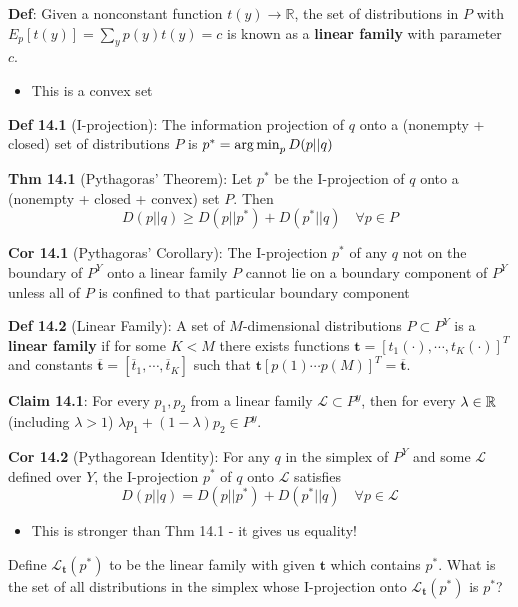 \documentclass[12pt]{article} %
\begin{document}
\textbf{Def}: Given a nonconstant function $t(y) \rightarrow \mathbb{R}$, the set of distributions in $P$ with $E_p[t(y)] = \sum_y p(y) t(y) = c$ is known as a \textbf{linear family} with parameter $c$. 
\begin{itemize}[topsep=-1pt, itemsep=-1pt]
    \item This is a convex set
\end{itemize}

\textbf{Def 14.1} (I-projection): The information projection of $q$ onto a (nonempty + closed) set of distributions $P$ is $p^* = \operatorname*{arg\,min}_p D(p||q)$

\textbf{Thm 14.1} (Pythagoras' Theorem): Let $p^*$ be the I-projection of $q$ onto a (nonempty + closed + convex) set $P$. Then 
\begin{equation*}
    D(p||q) \geq D(p ||p^*) + D(p^* || q) \quad \forall p \in P
\end{equation*}

\textbf{Cor 14.1} (Pythagoras' Corollary): The I-projection $p^*$ of any $q$ not on the boundary of $P^Y$ onto a linear family $P$ cannot lie on a boundary component of $P^Y$ unless all of $P$ is confined to that particular boundary component

\textbf{Def 14.2} (Linear Family): A set of $M$-dimensional distributions $P \subset P^Y$ is a \textbf{linear family} if for some $K < M$ there exists functions $\mathbf{t} = [t_1(\cdot), \cdots, t_K(\cdot)]^T$ and constants $\overline{\mathbf{t}} = [\overline{t}_1, \cdots, \overline{t}_K]$ such that $\mathbf{t}[p(1) \cdots p(M)]^T = \overline{\mathbf{t}}$.


\textbf{Claim 14.1}: For every $p_1,p_2$ from a linear family $\mathcal{L} \subset P^y$, then for every $\lambda \in \mathbb{R}$ (including $\lambda > 1$) $\lambda p_1 + (1-\lambda) p_2 \in P^y$.

\textbf{Cor 14.2} (Pythagorean Identity): For any $q$ in the simplex of $P^Y$ and some $\mathcal{L}$ defined over $Y$, the I-projection $p^*$ of $q$ onto $\mathcal{L}$ satisfies
\begin{equation*}
    D(p||q) = D(p||p^*) + D(p^* || q) \quad \forall p \in \mathcal{L}
\end{equation*}
\begin{itemize}[topsep=-1pt, itemsep=-1pt]
    \item This is stronger than Thm 14.1 - it gives us equality!
\end{itemize}

Define $\mathcal{L}_{\mathbf{t}}(p^*)$ to be the linear family with given $\mathbf{t}$ which contains $p^*$. What is the set of all distributions in the simplex whose I-projection onto $\mathcal{L}_{\mathbf{t}}(p^*)$ is $p^*$?
\end{document}
